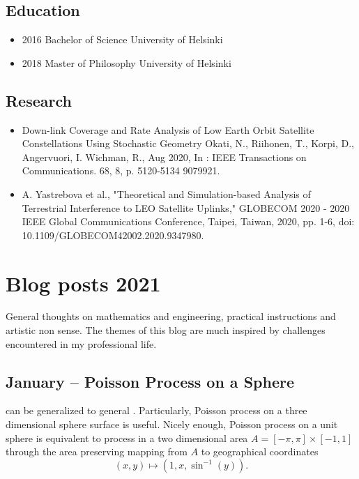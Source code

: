 \documentclass{article}
\begin{document}
        \subsection{Education}
        \begin{itemize}
        \item 2016 Bachelor of Science University of Helsinki\\
        \item 2018 Master of Philosophy University of Helsinki
        \end{itemize}
        \subsection{Research}

        \begin{itemize}
        \item Down-link Coverage and Rate Analysis of Low Earth Orbit Satellite Constellations Using Stochastic Geometry
          Okati, N., Riihonen, T., Korpi, D., Angervuori, I. Wichman, R., Aug 2020, In : IEEE Transactions on Communications. 68, 8, p. 5120-5134 9079921.\\
        \item A. Yastrebova et al., "Theoretical and Simulation-based Analysis of Terrestrial Interference to LEO Satellite Uplinks," GLOBECOM 2020 - 2020 IEEE Global Communications Conference, Taipei, Taiwan, 2020, pp. 1-6, doi: 10.1109/GLOBECOM42002.2020.9347980.
        \end{itemize}


        \section{Blog posts 2021}
        General thoughts on mathematics and engineering, practical instructions and artistic non sense. The themes of this blog are much inspired by challenges encountered in my professional life.

        \subsection{January – Poisson Process on a Sphere}
         can be generalized to general . Particularly, Poisson process on a three dimensional sphere surface is useful. Nicely enough, Poisson process on a unit sphere is equivalent to process in a two dimensional area $ A = [-\pi,\pi] \times [-1,1]$ through the area preserving mapping from $A$ to geographical coordinates
        \begin{equation}
          (x,y) \mapsto (1,x,\sin^{-1}(y)) \nonumber.
        \end{equation}
\end{document}
